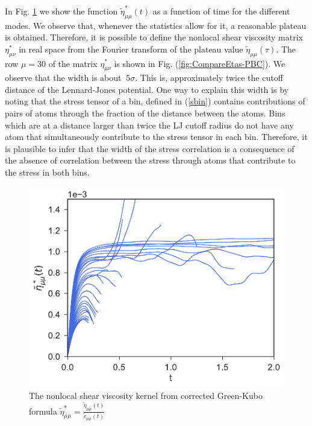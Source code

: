 \documentclass[b5paper,openright,10pt]{book}
\begin{document}
In    Fig.      \ref{fig:EtaStartFourier-PBC}    we    show     the    function
$\tilde{\eta}^{*}_{\mu\mu}(t)$  as a  function of  time for  the different
modes.   We observe  that, whenever  the  statistics allow  for it,  a
reasonable plateau  is obtained. Therefore,  it is possible  to define
the  nonlocal  shear  viscosity  matrix  $\eta^*_{\mu\nu}$ in real space  from  the
Fourier transform  of the plateau  value $\tilde{\eta}_{\mu\mu}(\tau)$.  
The row $\mu=30$ of the matrix $\eta^{*}_{\mu\nu}$ is shown in Fig. (\ref{fig:CompareEtas-PBC}). We observe that the width is about $~5\sigma$. This is, approximately twice the cutoff distance of the Lennard-Jones potential. 
One way to  explain this width is  by noting
that  the stress  tensor of  a bin,  defined in  (\ref{sbin}) contains
contributions of pairs  of atoms through the fraction  of the distance
between the atoms. Bins which are  at a distance larger than twice the
LJ cutoff radius  do not have any atom  that simultaneously contribute
to the stress tensor in each  bin. Therefore, it is plausible to infer
that the width of the stress correlation is a consequence of the absence
of correlation between the stress through atoms that contribute to the stress
in both bins.
\begin{figure}[h!]
  \centering
\includegraphics[scale=0.41]{EtaStartFourier-PBC}
\caption[The nonlocal shear viscosity kernel for an unconfined fluid]{The nonlocal shear viscosity kernel from corrected Green-Kubo formula $\tilde{\eta}^*_{\mu\mu}=\frac{\tilde{\eta}_{\mu\mu}(t)}{\tilde{c}_{\mu\mu}(t)}$}
\label{fig:EtaStartFourier-PBC}
\end{figure}
\end{document}
